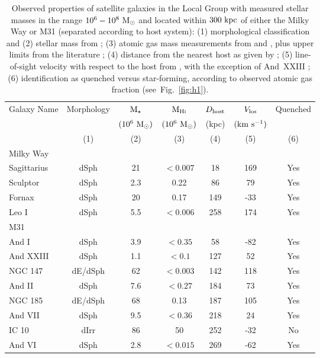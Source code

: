 \begin{table}
\centering 
\begin{tabular}{lcccccc} 
  \hline\hline 
  Galaxy Name & Morphology & ${\rm M}_{\star}$ &
  ${\rm M}_{\rm H{\textsc{\tiny I}}}$ & $D_{\rm host}$ &
  $V_{\rm los}$ & Quenched \\
  & & $(10^{6}~{\rm M}_{\odot})$ & $(10^{6}~{\rm M}_{\odot})$ & (kpc) & $({\rm km}~{\rm s}^{-1})$ & \\
  & (1) & (2) & (3) & (4) & (5) & (6) \\
  \hline\hline
  Milky Way &  & & & & & \\
  \hline
Sagittarius & dSph & 21 & $< 0.007$ & 18 & 169 & Yes \\
Sculptor & dSph & 2.3 & 0.22 & 86 & 79 & Yes \\
Fornax & dSph & 20 & 0.17 & 149 & -33 & Yes \\
Leo I & dSph & 5.5 & $< 0.006$ & 258 & 174 & Yes \\
\hline
M31 &   & & & & & \\
\hline
And I & dSph & 3.9 & $< 0.35$ & 58 & -82 & Yes \\
And XXIII & dSph & 1.1 & $<0.1$ & 127 & 52 & Yes \\
NGC 147 & dE/dSph & 62 & $< 0.003$ & 142 & 118 & Yes \\
And II & dSph & 7.6 & $< 0.27$ & 184 & 73 & Yes \\
NGC 185 & dE/dSph & 68 & 0.13 & 187 & 105 & Yes \\
And VII & dSph & 9.5 & $< 0.36$ & 218 & 24 & Yes \\
IC 10 & dIrr & 86 & 50 & 252 & -32 & No \\
And VI & dSph & 2.8 & $< 0.015$ & 269 & -62 & Yes \\
\hline 
\hline
\end{tabular} 
\label{table:dwarfs} 
\caption[LG dwarf galaxy properties]{Observed properties of satellite galaxies in the Local Group
  with measured stellar masses in the range $10^{6}-10^{8}~{\rm M}_{\odot}$ and
  located within $300~{\rm kpc}$ of either the Milky Way or M31 (separated
  according to host system):  
  (1) morphological classification and (2)
  stellar mass from \citet{mcconnachie12}; (3)
  atomic gas mass measurements from \citet{mcconnachie12} and
  \citet{grcevich09}, plus upper limits from the literature
  \citep{burton99, grcevich09, huang12a, giovanelli13};
  (4) distance from the nearest host as given by \citet{mcconnachie12};   
  (5) line-of-sight velocity with respect to the host from
  \citet{mcconnachie12}, with the exception of And~XXIII 
  \citep{kirby14}; (6) identification as quenched 
  versus star-forming, according to observed atomic gas fraction
  (see~Fig.~\ref{fig:h1}). } 
\end{table} 




